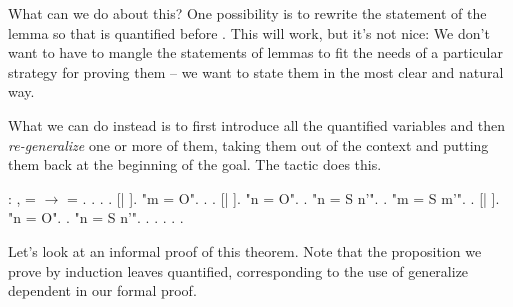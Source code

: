 \documentclass[12pt]{report}
\begin{document}
 What can we do about this?  One possibility is to rewrite the
    statement of the lemma so that  is quantified before .  This
    will work, but it's not nice: We don't want to have to mangle the
    statements of lemmas to fit the needs of a particular strategy for
    proving them -- we want to state them in the most clear and
    natural way. 

  What we can do instead is to first introduce all the
    quantified variables and then \textit{re-generalize} one or more of
    them, taking them out of the context and putting them back at
    the beginning of the goal.  The   tactic
    does this. \begin{coqdoccode}
\coqdocemptyline
\coqdocnoindent
{}  : \coqdockw{\ensuremath{\forall}}  ,\coqdoceol
\coqdocindent{2.50em}
  =   \ensuremath{\rightarrow}\coqdoceol
\coqdocindent{2.50em}
 = .\coqdoceol
\coqdocnoindent
{}.\coqdoceol
\coqdocindent{1.00em}
  .\coqdoceol
\coqdocindent{1.00em}
  .\coqdoceol
\coqdocindent{1.00em}
   [| ].\coqdoceol
\coqdocindent{1.00em}
 "m = O". .   .    [| ].\coqdoceol
\coqdocindent{2.00em}
 "n = O". .\coqdoceol
\coqdocindent{2.00em}
 "n = S n'".  .\coqdoceol
\coqdocindent{1.00em}
 "m = S m'".   .    [| ].\coqdoceol
\coqdocindent{2.00em}
 "n = O".  .\coqdoceol
\coqdocindent{2.00em}
 "n = S n'".  .\coqdoceol
\coqdocindent{3.00em}
 .  . . .\coqdoceol
\coqdocemptyline
\end{coqdoccode}
Let's look at an informal proof of this theorem.  Note that
    the proposition we prove by induction leaves  quantified,
    corresponding to the use of generalize dependent in our formal
    proof.
\end{document}
